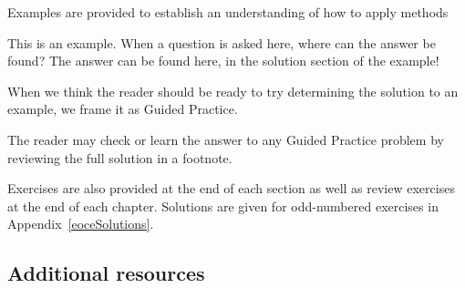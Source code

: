 \noindent%
Examples are provided to establish an understanding of how
to apply methods

\begin{examplewrap}
\begin{nexample}{This is an example.
    When a question is asked here, where can the answer be found?}
  The answer can be found here, in the solution section
  of the example!
\end{nexample}
\end{examplewrap}

\noindent%
When we think the reader should be ready to try determining
the solution to an example, we frame it as Guided Practice.

\begin{exercisewrap}
\begin{nexercise}
The reader may check or learn the answer to any Guided Practice
problem by reviewing the full solution in a footnote.\footnotemark{}
\end{nexercise}
\end{exercisewrap}

\noindent%
Exercises are also provided at the end of each section
as well as review exercises at the end of each chapter.
Solutions are given for odd-numbered exercises in
Appendix~\ref{eoceSolutions}.


\subsection*{Additional resources}

